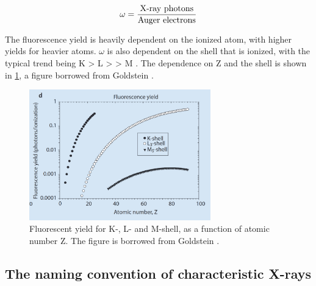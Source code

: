 \begin{equation}
    \label{eq:theory:theoreticalxray:yield}
    \omega = \frac{\textnormal{X-ray photons}}{\textnormal{Auger electrons}}
\end{equation}

The fluorescence yield is heavily dependent on the ionized atom, with higher yields for heavier atoms.
$\omega$ is also dependent on the shell that is ionized, with the typical trend being K > L > > M \cite[p. 267]{goldstein_scanning_2018}.
The dependence on Z and the shell is shown in \cref{fig:theory:fluorescence_yield}, a figure borrowed from Goldstein \cite{goldstein_scanning_2018}.

\begin{figure}[ht]
    \centering
    \includegraphics[width=0.7\textwidth]{figures/fluorescence_yield_Goldstein_Fig4-3-d.png}
    \caption{
        Fluorescent yield for K-, L- and M-shell, as a function of atomic number Z.
        The figure is borrowed from Goldstein \cite[Fig. 4.3 (d)]{goldstein_scanning_2018}.
    }
    \label{fig:theory:fluorescence_yield}
\end{figure}








\subsection{The naming convention of characteristic X-rays}
\label{theory:xray_formation:naming}


